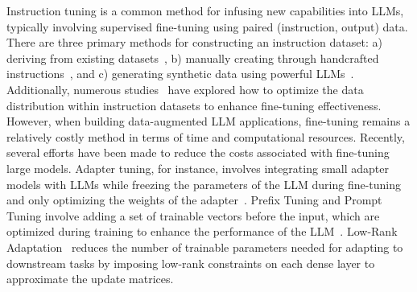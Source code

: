 Instruction tuning is a common method for infusing new capabilities into LLMs, typically involving supervised fine-tuning using paired (instruction, output) data. There are three primary methods for constructing an instruction dataset: a) deriving from existing datasets~\cite{longpre2023flan, sanh2021multitask}, b) manually creating through handcrafted instructions~\cite{ouyang2022training, conover2023free, kopf2024openassistant}, and c) generating synthetic data using powerful LLMs~\cite{xu2023wizardlm, wang2022self}. Additionally, numerous studies~\cite{raffel2020exploring, iyer2022opt, wang2023far} have explored how to optimize the data distribution within instruction datasets to enhance fine-tuning effectiveness. However, when building data-augmented LLM applications, fine-tuning remains a relatively costly method in terms of time and computational resources. Recently, several efforts have been made to reduce the costs associated with fine-tuning large models. Adapter tuning, for instance, involves integrating small adapter models with LLMs while freezing the parameters of the LLM during fine-tuning and only optimizing the weights of the adapter~\cite{houlsby2019parameter, he2021towards, lei2023conditional, chronopoulou2023adaptersoup}. Prefix Tuning and Prompt Tuning involve adding a set of trainable vectors before the input, which are optimized during training to enhance the performance of the LLM~\cite{petrov2023prompting, mahabadi2021parameter, zhu2023spt, wang2023aprompt, choi2023smop}. Low-Rank Adaptation~\cite{hu2021lora, valipour2022dylora, zhang2023adalora, ding2023sparse, liu2024dora} reduces the number of trainable parameters needed for adapting to downstream tasks by imposing low-rank constraints on each dense layer to approximate the update matrices.


